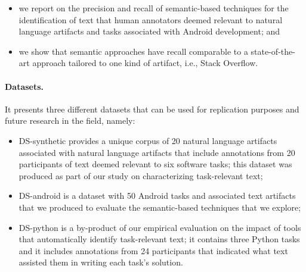 \begin{itemize}
    
    \item we report on the precision and recall of semantic-based techniques for the identification of text that human annotators deemed relevant to natural language artifacts and tasks associated with Android development; and

    \item we show that semantic approaches have recall comparable to a state-of-the-art approach
    tailored to one kind of artifact, i.e., Stack Overflow.
\end{itemize}


\paragraph{\textbf{Datasets.}} 

It presents three different datasets that can be used for replication purposes and future research in the field, namely:
    
\begin{itemize}
    \item \acs{DS-synthetic} provides a unique corpus of 20 natural language artifacts associated
    with natural language artifacts that include annotations from 20 participants of text deemed relevant to six software tasks; this dataset was produced as part of our study on characterizing task-relevant text;
    
    \item \acs{DS-android} is a dataset with 50 Android tasks and associated text artifacts 
    that we produced to evaluate the semantic-based techniques that we explore;

    \item \acs{DS-python} is a by-product of our empirical evaluation on the impact of tools that automatically identify task-relevant text;
    it contains three Python tasks and it includes annotations from 24 participants that indicated what text assisted them in writing each task's solution.
\end{itemize}